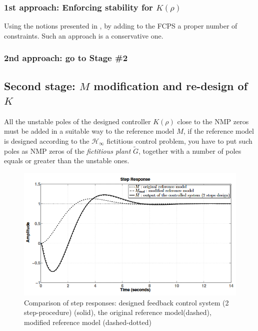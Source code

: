 \subsubsection{1st approach: Enforcing stability for $K(\rho)$}
Using the notions presented in , by adding to the FCPS a proper number of constraints. Such an approach is a conservative one. 
\subsubsection{2nd approach: go to Stage \#2}


\subsection{Second stage: $M$ modification and re-design of $K$}
All the unstable poles of the designed controller $K(\rho)$ close to the NMP zeros must be added in a suitable way to the reference model $M$, if the reference model is designed according to the $\mathcal{H}_\infty$ fictitious control problem, you have to put such poles as NMP zeros of the \textit{fictitious plant} $\tilde{G}$, together with a number of poles equals or greater than the unstable ones.

\begin{figure}[h]
    \centering 
    \includegraphics[scale=1]{img/NMP_1.png}
    \caption{Comparison of step responses: designed feedback control system (2 step-procedure) (solid), the original reference model(dashed), modified reference model (dashed-dotted)}
\end{figure}